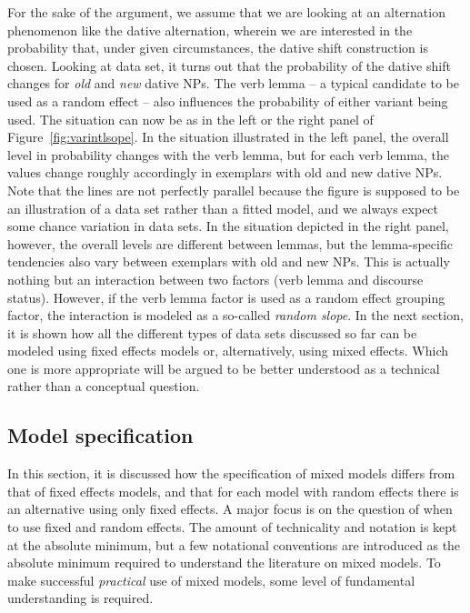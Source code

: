 \documentclass[a4paper,12pt]{article}
\begin{document}
For the sake of the argument, we assume that we are looking at an alternation phenomenon like the dative alternation, wherein we are interested in the probability that, under given circumstances, the dative shift construction is chosen.
Looking at data set, it turns out that the probability of the dative shift changes for \textit{old} and \textit{new} dative NPs.
The verb lemma -- a typical candidate to be used as a random effect -- also influences the probability of either variant being used.
The situation can now be as in the left or the right panel of Figure~\ref{fig:varintlsope}.
In the situation illustrated in the left panel, the overall level in probability changes with the verb lemma, but for each verb lemma, the values change roughly accordingly in exemplars with old and new dative NPs.
Note that the lines are not perfectly parallel because the figure is supposed to be an illustration of a data set rather than a fitted model, and we always expect some chance variation in data sets.
In the situation depicted in the right panel, however, the overall levels are different between lemmas, but the lemma-specific tendencies also vary between exemplars with old and new NPs.
This is actually nothing but an interaction between two factors (verb lemma and discourse status).
However, if the verb lemma factor is used as a random effect grouping factor, the interaction is modeled as a so-called \textit{random slope}.
In the next section, it is shown how all the different types of data sets discussed so far can be modeled using fixed effects models or, alternatively, using mixed effects.
Which one is more appropriate will be argued to be better understood as a technical rather than a conceptual question.

\subsection{Model specification}
\label{sec:modelspecification}

In this section, it is discussed how the specification of mixed models differs from that of fixed effects models, and that for each model with random effects there is an alternative using only fixed effects.
A major focus is on the question of when to use fixed and random effects.
The amount of technicality and notation is kept at the absolute minimum, but a few notational conventions are introduced as the absolute minimum required to understand the literature on mixed models.
To make successful \textit{practical} use of mixed models, some level of fundamental understanding is required.
\end{document}

